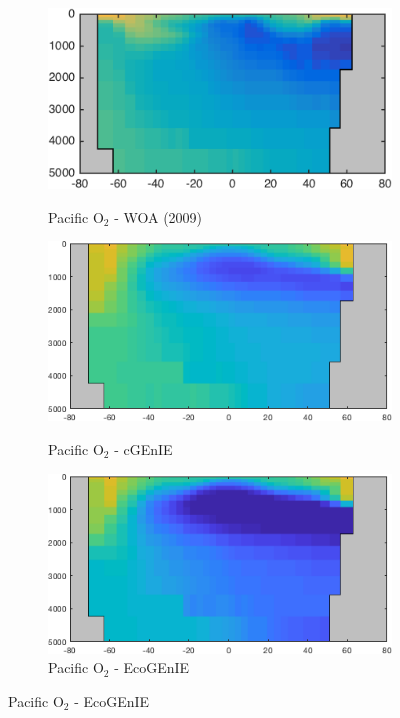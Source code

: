 \documentclass{article}
\begin{document}
\begin{figure}[htp]
\begin{subfigure}{.33\textwidth}
 \label{fig:nutrients2}
\end{subfigure}
\begin{subfigure}{.33\textwidth}
 \caption{Pacific O$_2$ - WOA (2009)}
 \includegraphics[width=0.95\linewidth]{../Separate_figures/OBSERVATIONS/Pacific_o_an_profile.png}
 \label{fig:nutrients1}
\end{subfigure}%
\begin{subfigure}{.33\textwidth}
 \caption{Pacific O$_2$ - cGEnIE}
 \includegraphics[width=0.95\linewidth]{../Separate_figures/BIOGEM/Pacific_ocn_O2_profile.png}
 \label{fig:nutrients1}
\end{subfigure}%
\begin{subfigure}{.33\textwidth}
 \caption{Pacific O$_2$ - EcoGEnIE}
 \includegraphics[width=0.95\linewidth]{../Separate_figures/ECOGEM/Pacific_ocn_O2_profile.png}

\end{subfigure}
\end{figure}
\end{document}
